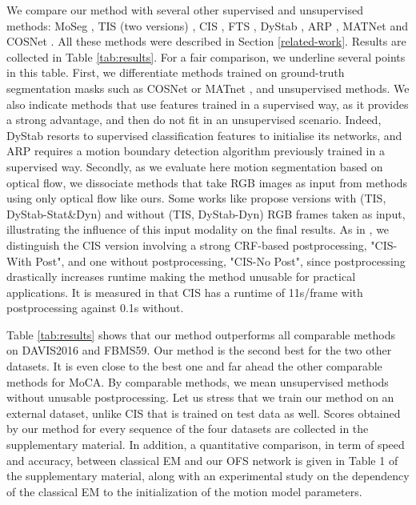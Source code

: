 \documentclass[10pt,twocolumn,letterpaper]{article}
\begin{document}
We compare our method with several other supervised and unsupervised methods: MoSeg \cite{yang_motion-grouping_2021}, TIS (two versions) \cite{griffin_tukey-inspired_2019}, CIS \cite{yang_unsupervised_2019}, FTS \cite{papazoglou_fast_2013}, DyStab \cite{dystab}, ARP \cite{arp}, MATNet \cite{matnet} and COSNet \cite{cosnet}. All these methods were described in Section \ref{related-work}. Results are collected in Table \ref{tab:results}. For a fair comparison, we underline several points in this table. First, we differentiate methods trained on ground-truth segmentation masks such as COSNet \cite{cosnet} or MATnet \cite{matnet}, and unsupervised methods. We also indicate methods that use features trained in a supervised way, as it provides a strong advantage, and then do not fit in an unsupervised scenario. Indeed, DyStab \cite{dystab} resorts to supervised classification features to initialise its networks, and ARP \cite{arp} requires a motion boundary detection algorithm previously trained in a supervised way. Secondly, as we evaluate here motion segmentation based on optical flow, we dissociate methods that take RGB images as input from methods using only optical flow like ours. Some works like \cite{griffin_tukey-inspired_2019, dystab} propose versions with (TIS, DyStab-Stat\&Dyn) and without (TIS, DyStab-Dyn) RGB frames taken as input, illustrating the influence of this input modality on the final results. As in \cite{yang_motion-grouping_2021}, we distinguish the CIS version involving a strong CRF-based postprocessing, "CIS-With Post", and one without postprocessing, "CIS-No Post", since postprocessing drastically increases runtime making the method unusable for practical applications. It is measured in \cite{yang_motion-grouping_2021} that CIS \cite{yang_unsupervised_2019} has a runtime of 11s/frame with postprocessing against 0.1s without.



Table \ref{tab:results} shows that our method outperforms all comparable methods on DAVIS2016 and FBMS59. Our method is the second best for the two other datasets. It is even close to the best one and far ahead the other comparable methods for MoCA. By comparable methods, we mean unsupervised methods without unusable postprocessing. Let us stress that we train our method on an external dataset, unlike CIS that is trained on test data as well. Scores obtained by our method for every sequence of the four datasets are collected in the supplementary material. {\color{black} In addition, a quantitative comparison, in term of speed and accuracy, between classical EM and our OFS network is given in Table 1 of the supplementary material, along with an experimental study on the dependency of the classical EM to the initialization of the motion model parameters.}
\end{document}
